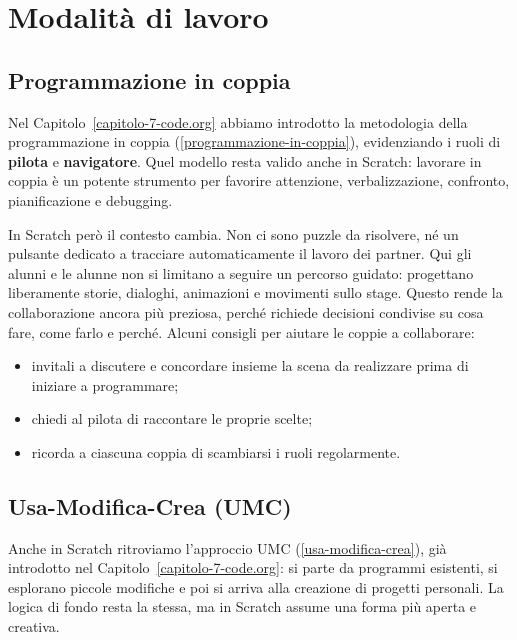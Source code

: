 \section{Modalità di lavoro }\label{modalituxe0-di-lavoro-5}

\subsection{Programmazione in coppia }\label{programmazione-in-coppia-1}

Nel Capitolo~\ref{capitolo-7-code.org} abbiamo introdotto la metodologia della programmazione in coppia (\ref{programmazione-in-coppia}), evidenziando i ruoli di \textbf{pilota} e \textbf{navigatore}. Quel modello resta valido anche in Scratch: lavorare in coppia è un potente strumento per favorire attenzione, verbalizzazione, confronto, pianificazione e debugging.

In Scratch però il contesto cambia. Non ci sono puzzle da risolvere, né un pulsante dedicato a tracciare automaticamente il lavoro dei partner. Qui gli alunni e le alunne non si limitano a seguire un percorso guidato: progettano liberamente storie, dialoghi, animazioni e movimenti sullo stage. Questo rende la collaborazione ancora più preziosa, perché richiede decisioni condivise su cosa fare, come farlo e perché. Alcuni consigli per aiutare le coppie a collaborare:

\begin{itemize}
\item
  invitali a discutere e concordare insieme la scena da realizzare prima di iniziare a programmare;
\item
  chiedi al pilota di raccontare le proprie scelte;
\item
  ricorda a ciascuna coppia di scambiarsi i ruoli regolarmente.
\end{itemize}

\subsection{Usa-Modifica-Crea (UMC) }\label{usa-modifica-crea-umc}

Anche in Scratch ritroviamo l'approccio UMC (\ref{usa-modifica-crea}), già introdotto nel Capitolo~\ref{capitolo-7-code.org}: si parte da programmi esistenti, si esplorano piccole modifiche e poi si arriva alla creazione di progetti personali. La logica di fondo resta la stessa, ma in Scratch assume una forma più aperta e creativa.

